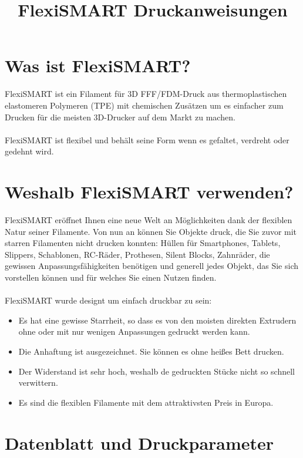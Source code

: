 \documentclass[11pt,a4paper]{article}
\title{﻿﻿FlexiSMART Druckanweisungen}
\date{}
\begin{document}

\section{Was ist FlexiSMART?}FlexiSMART ist ein Filament für 3D FFF/FDM-Druck aus thermoplastischen elastomeren Polymeren (TPE) mit chemischen Zusätzen um es einfacher zum Drucken für die meisten 3D-Drucker auf dem Markt zu machen.
\\\\
FlexiSMART ist flexibel und behält seine Form wenn es gefaltet, verdreht oder gedehnt wird.

\section{Weshalb FlexiSMART verwenden?}
FlexiSMART eröffnet Ihnen eine neue Welt an Möglichkeiten dank der flexiblen Natur seiner Filamente. Von nun an können Sie Objekte druck, die Sie zuvor mit starren Filamenten nicht drucken konnten: Hüllen für Smartphones, Tablets, Slippers, Schablonen, RC-Räder, Prothesen, Silent Blocks, Zahnräder, die gewissen Anpassungsfähigkeiten benötigen und generell jedes Objekt, das Sie sich vorstellen können und für welches Sie einen Nutzen finden.
\\\\
FlexiSMART wurde designt um einfach druckbar zu sein:
\begin{itemize}
\item Es hat eine gewisse Starrheit, so dass es von den moisten direkten Extrudern ohne oder mit nur wenigen Anpassungen gedruckt werden kann.
\item Die Anhaftung ist ausgezeichnet. Sie können es ohne heißes Bett drucken.
\item Der Widerstand ist sehr hoch, weshalb de gedruckten Stücke nicht so schnell verwittern.
\item Es sind die flexiblen Filamente mit dem attraktivsten Preis in Europa. 
\end{itemize}

\section{Datenblatt und Druckparameter}
\end{document}
